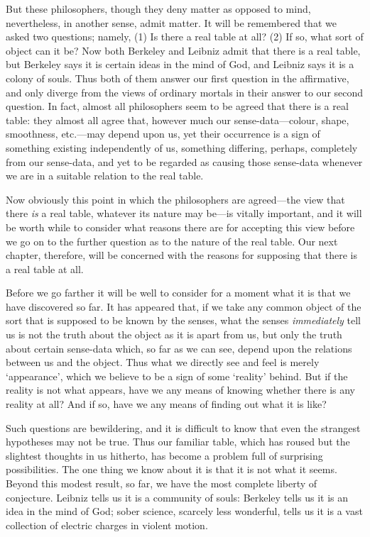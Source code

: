 \documentclass[oneside,letterpaper,12pt]{book}
\begin{document}
But these philosophers, though they deny matter as opposed to mind,
nevertheless, in another sense, admit matter. It will be remembered that
we asked two questions; namely, (1) Is there a real table at all? (2) If
so, what sort of object can it be? Now both Berkeley and Leibniz admit
that there is a real table, but Berkeley says it is certain ideas in the
mind of God, and Leibniz says it is a colony of souls. Thus both of them
answer our first question in the affirmative, and only diverge from the
views of ordinary mortals in their answer to our second question. \label{Q1} In
fact, almost all philosophers seem to be agreed that there is a real
table: they almost all agree that, however much our sense-data---colour,
shape, smoothness, etc.---may depend upon us, yet their occurrence is a
sign of something existing independently of us, something differing,
perhaps, completely from our sense-data, and yet to be regarded as
causing those sense-data whenever we are in a suitable relation to the
real table.

Now obviously this point in which the philosophers are agreed---the view
that there \emph{is} a real table, whatever its nature may be---is
vitally important, and it will be worth while to consider what reasons
there are for accepting this view before we go on to the further
question as to the nature of the real table. Our next chapter,
therefore, will be concerned with the reasons for supposing that there
is a real table at all.

Before we go farther it will be well to consider for a moment what it is
that we have discovered so far. It has appeared that, if we take any
common object of the sort that is supposed to be known by the senses,
what the senses \emph{immediately} tell us is not the truth about the
object as it is apart from us, but only the truth about certain
sense-data which, so far as we can see, depend upon the relations
between us and the object. Thus what we directly see and feel is merely
`appearance', which we believe to be a
sign of some `reality' behind. But if
the reality is not what appears, have we any means of knowing whether
there is any reality at all? And if so, have we any means of finding out
what it is like?

Such questions are bewildering, and it is difficult to know that even
the strangest hypotheses may not be true. Thus our familiar table, which
has roused but the slightest thoughts in us hitherto, has become a
problem full of surprising possibilities. The one thing we know about it
is that it is not what it seems. Beyond this modest result, so far, we
have the most complete liberty of conjecture. Leibniz tells us it is a
community of souls: Berkeley tells us it is an idea in the mind of God;
sober science, scarcely less wonderful, tells us it is a vast collection
of electric charges in violent motion.
\end{document}
